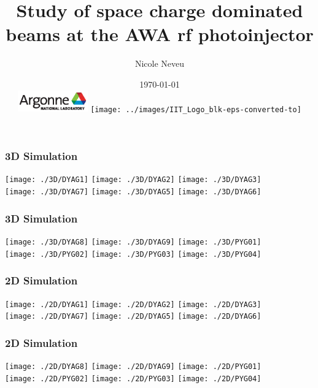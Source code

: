\documentclass[professionalfonts,t]{beamer}
\title[PBG plots]{Study of space charge dominated beams at the AWA rf photoinjector}
\author[N.Neveu]{{\Large Nicole Neveu}}
\institute[ANL, IIT] %
{   Illinois Institute of Technology \\
	Argonne National Laboratory \\
    \url{nneveu@anl.gov} 
}
\date{ \today \\
\includegraphics[width=3cm,keepaspectratio]{../images/Argonne_cmyk_black}%
\hfill \hfill \hfill%
\texttt{[image: ../images/IIT\_Logo\_blk-eps-converted-to]}%
}
\begin{document}
\begin{frame}
	\frametitle{3D Simulation}
	\centering
	\texttt{[image: ./3D/DYAG1]}%
	\texttt{[image: ./3D/DYAG2]}
	\texttt{[image: ./3D/DYAG3]}\\
	\vspace{1.5em}
	\texttt{[image: ./3D/DYAG7]}
	\texttt{[image: ./3D/DYAG5]}
    \texttt{[image: ./3D/DYAG6]}
\end{frame}


\begin{frame}
	\frametitle{3D Simulation}
	\centering
	\texttt{[image: ./3D/DYAG8]}
	\texttt{[image: ./3D/DYAG9]}
	\texttt{[image: ./3D/PYG01]}\\%
	\vspace{1.5em}
	\texttt{[image: ./3D/PYG02]}
	\texttt{[image: ./3D/PYG03]}
	\texttt{[image: ./3D/PYG04]}%

\end{frame}
\begin{frame}
	\frametitle{2D Simulation}
	\centering
	\texttt{[image: ./2D/DYAG1]}%
	\texttt{[image: ./2D/DYAG2]}
	\texttt{[image: ./2D/DYAG3]}\\
	\vspace{1.5em}
	\texttt{[image: ./2D/DYAG7]}
	\texttt{[image: ./2D/DYAG5]}
	\texttt{[image: ./2D/DYAG6]}
\end{frame}


\begin{frame}
	\frametitle{2D Simulation}
	\centering
	\texttt{[image: ./2D/DYAG8]}
	\texttt{[image: ./2D/DYAG9]}
	\texttt{[image: ./2D/PYG01]}\\%
	\vspace{1.5em}
	\texttt{[image: ./2D/PYG02]}
	\texttt{[image: ./2D/PYG03]}
	\texttt{[image: ./2D/PYG04]}%
	
\end{frame}
\end{document}
